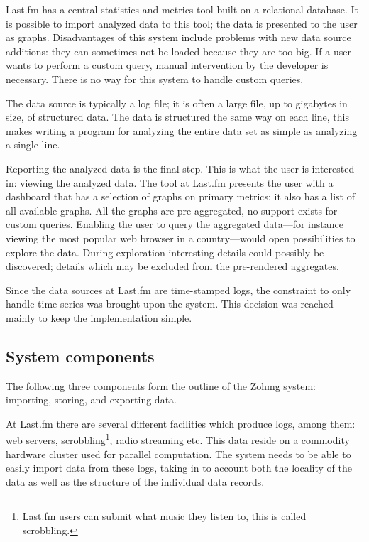 Last.fm has a central statistics and metrics tool built on a relational
database. It is possible to import analyzed data to this tool; the data is
presented to the user as graphs. Disadvantages of this system include problems
with new data source additions: they can sometimes not be loaded because they
are too big. If a user wants to perform a custom query, manual intervention by
the developer is necessary. There is no way for this system to handle custom
queries.

The data source is typically a log file; it is often a large file, up to
gigabytes in size, of structured data. The data is structured the same way on
each line, this makes writing a program for analyzing the entire data set as
simple as analyzing a single line.

Reporting the analyzed data is the final step. This is what the user is
interested in: viewing the analyzed data. The tool at Last.fm presents the user
with a dashboard that has a selection of graphs on primary metrics; it also has
a list of all available graphs. All the graphs are pre-aggregated, no support
exists for custom queries. Enabling the user to query the aggregated data---for
instance viewing the most popular web browser in a country---would open
possibilities to explore the data. During exploration interesting details could
possibly be discovered; details which may be excluded from the pre-rendered
aggregates.

Since the data sources at Last.fm are time-stamped logs, the constraint to only
handle time-series was brought upon the system. This decision was reached
mainly to keep the implementation simple.


\subsection*{System components}

The following three components form the outline of the Zohmg system: importing,
storing, and exporting data.

At Last.fm there are several different facilities which produce logs, among
them: web servers, scrobbling\footnote{Last.fm users can submit what music they
listen to, this is called scrobbling.}, radio streaming etc. This data reside
on a commodity hardware cluster used for parallel computation. The system needs to
be able to easily import data from these logs, taking in to account both the
locality of the data as well as the structure of the individual data records.

